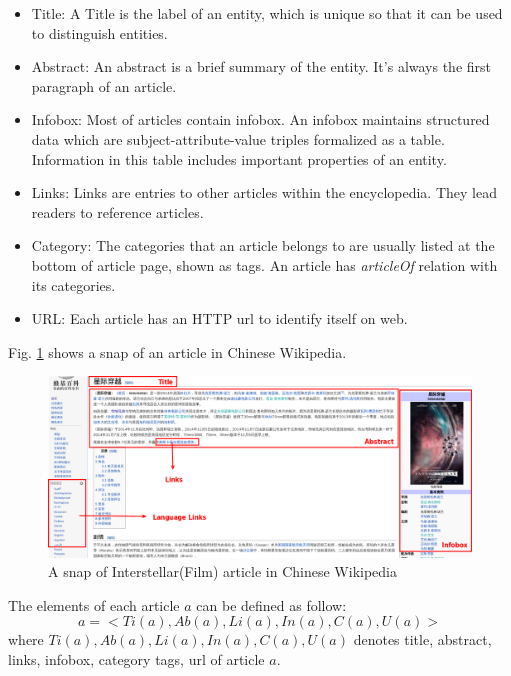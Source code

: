 \documentclass[runningheads,a4paper]{llncs}
\begin{document}
\begin{CJK*}{UTF8}{song}
\begin{itemize}
  \item Title: A Title is the label of an entity, which is unique so that it can be used to distinguish entities.
  \item Abstract: An abstract is a brief summary of the entity. It's always the first paragraph of an article.
  \item Infobox: Most of articles contain infobox. An infobox maintains structured data which are subject-attribute-value triples formalized as a table. Information in this table includes important properties of an entity.
  \item Links: Links are entries to other articles within the encyclopedia. They lead readers to reference articles. 
  \item Category: The categories that an article belongs to are usually listed at the bottom of article page, shown as tags. An article has \textit{articleOf} relation with its categories.
  \item URL: Each article has an HTTP url to identify itself on web.
\end{itemize}

Fig. \ref{fig:interstellar} shows a snap of an article in Chinese Wikipedia.
\begin{figure}[ht]
    \centerline{\includegraphics[width=1\columnwidth]{fig/interstellar}}
    \caption{A snap of Interstellar(Film) article in Chinese Wikipedia}
    \label{fig:interstellar}
\end{figure}%

The elements of each article $a$ can be defined as follow:
\begin{equation}
    a = <Ti(a),Ab(a),Li(a),In(a),C(a),U(a)>
\end{equation}
where $Ti(a),Ab(a),Li(a),In(a),C(a),U(a)$ denotes title, abstract, links, infobox, category tags, url of article $a$.


\end{CJK*}
\end{document}
